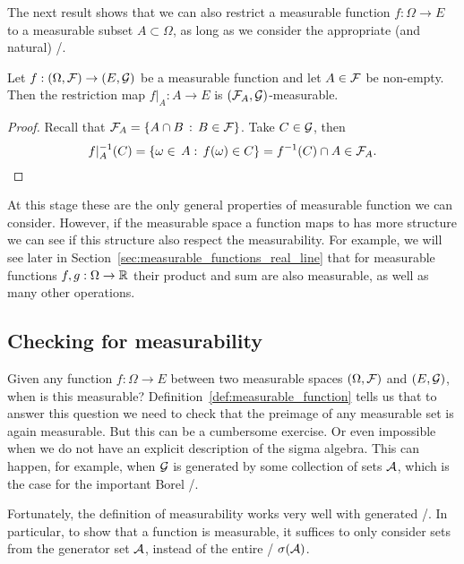 The next result shows that we can also restrict a measurable function $f : \Omega \to E$ to a measurable subset $A \subset \Omega$, as long as we consider the appropriate (and natural) \sigalg/.

\begin{lemma}
Let $f: (\Omega, \mathcal F) \to (E, \mathcal G)$ be a measurable function and let $A \in \mathcal F$ be non-empty. Then the restriction map $f|_A : A \to E$ is $(\mathcal F_A, \mathcal G)$-measurable.
\end{lemma}

\begin{proof}
Recall that $\mathcal F_A = \{A \cap B \, : \, B \in \mathcal F\}$. Take $C \in \mathcal G$, then
\[
	f|_A^{-1}(C) = \{\omega \in \, A : \, f(\omega) \in C\} = f^{-1}(C) \cap A \in \mathcal F_A.\qedhere
\]
\end{proof}

At this stage these are the only general properties of measurable function we can consider. However, if the measurable space a function maps to has more structure we can see if this structure also respect the measurability. For example, we will see later in Section~\ref{sec:measurable_functions_real_line} that for measurable functions $f, g : \Omega \to \mathbb R$ their product and sum are also measurable, as well as many other operations.

\subsection{Checking for measurability}

Given any function $f : \Omega \to E$ between two measurable spaces $(\Omega, \mathcal F)$ and $(E, \mathcal G)$, when is this measurable? Definition~\ref{def:measurable_function} tells us that to answer this question we need to check that the preimage of any measurable set is again measurable. But this can be a cumbersome exercise. Or even impossible when we do not have an explicit description of the sigma algebra. This can happen, for example, when $\mathcal G$ is generated by some collection of sets $\mathcal A$, which is the case for the important Borel \sigalg/. 

Fortunately, the definition of measurability works very well with generated \sigalgs/. In particular, to show that a function is measurable, it suffices to only consider sets from the generator set $\mathcal A$, instead of the entire \sigalg/ $\sigma(\mathcal A)$.

